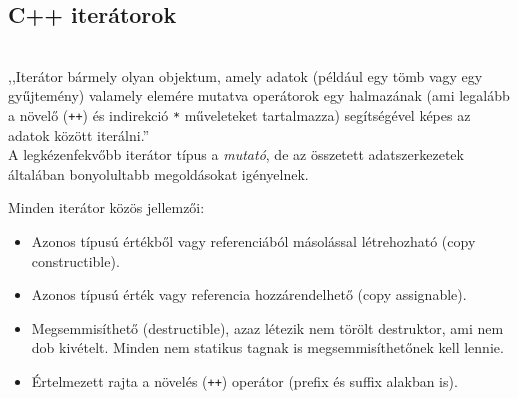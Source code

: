\begin{frame}
    \begin{exampleblock}{}
        \scriptsize
        
    \end{exampleblock}
\end{frame}

\begin{frame}
    \begin{exampleblock}{}
        \scriptsize
        
    \end{exampleblock}
\end{frame}

\subsection{C++ iterátorok}

\begin{frame}
    \begin{description}[m]
        \item[C++ iterátorok] \hfill \\ ,,Iterátor bármely olyan objektum, amely adatok (például egy tömb vagy egy gyűjtemény) valamely elemére mutatva operátorok egy halmazának (ami legalább a növelő (\texttt{++}) és indirekció \texttt{*} műveleteket tartalmazza) segítségével képes az adatok között iterálni.'' \\
        A legkézenfekvőbb iterátor típus a \emph{mutató}, de az összetett adatszerkezetek általában bonyolultabb megoldásokat igényelnek.
    \end{description}
\end{frame}

\begin{frame}
    Minden iterátor közös jellemzői:
    \begin{itemize}
        \item Azonos típusú értékből vagy referenciából másolással létrehozható (copy constructible).
        \item Azonos típusú érték vagy referencia hozzárendelhető (copy assignable).
        \item Megsemmisíthető (destructible), azaz létezik nem törölt destruktor, ami nem dob kivételt. Minden nem statikus tagnak is megsemmisíthetőnek kell lennie.
        \item Értelmezett rajta a növelés (\texttt{++}) operátor (prefix és suffix alakban is).
    \end{itemize}
\end{frame}


